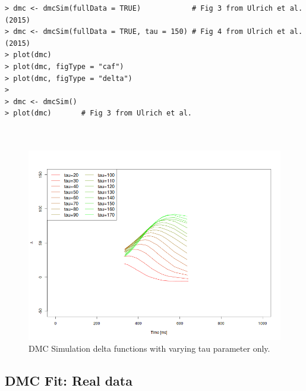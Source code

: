 \begin{minipage}{\linewidth}
    \begin{lstlisting}[style = R, title = {R Code Example 2}, captionpos = t]
> dmc <- dmcSim(fullData = TRUE)            # Fig 3 from Ulrich et al. (2015)
> dmc <- dmcSim(fullData = TRUE, tau = 150) # Fig 4 from Ulrich et al. (2015)
> plot(dmc)
> plot(dmc, figType = "caf")    
> plot(dmc, figType = "delta")
> 
> dmc <- dmcSim() 
> plot(dmc)       # Fig 3 from Ulrich et al. 

    
\end{lstlisting}
\end{minipage}

\begin{figure}
    \includegraphics[width=1\textwidth]{../figures/figure4.png}
    \caption{DMC Simulation delta functions with varying tau parameter only.}
    \label{fig:2}
\end{figure}

\subsection{DMC Fit: Real data} 
\label{dmc_fit} 

